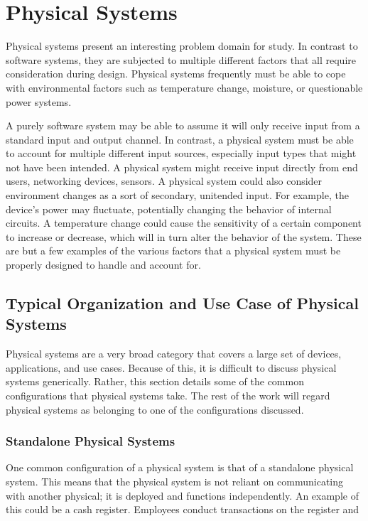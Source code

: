 
\chapter{Physical Systems}
\label{chapter:physicalsystems}

Physical systems present an interesting problem domain for study. In contrast to software systems,
they are subjected to multiple different factors that all require consideration during design. Physical
systems frequently must be able to cope with environmental factors such as temperature change, moisture,
or questionable power systems. 

A purely software system may be able to assume it will only receive input from a standard input and output
channel. In contrast, a physical system must be able
to account for multiple different input sources, especially input types that might not have been intended. 
A physical system might receive input directly from end users, networking devices, sensors. A physical
system could also consider environment changes as a sort of secondary, unitended input. For example,
the device's power may fluctuate, potentially changing the behavior of internal circuits. A temperature change
could cause the sensitivity of a certain component to increase or decrease, which will in turn alter the behavior
of the system. These are but a few examples of the various factors that a physical system must be properly
designed to handle and account for.

\section{Typical Organization and Use Case of Physical Systems}
Physical systems are a very broad category that covers a large set of devices, applications, and use cases.
Because of this, it is difficult to discuss physical systems generically. Rather, this section details some
of the common configurations that physical systems take. The rest of the work will regard physical systems as
belonging to one of the configurations discussed.

\subsection*{Standalone Physical Systems}
One common configuration of a physical system is that of a standalone physical system. This means that the
physical system is not reliant on communicating with another physical; it is deployed and functions
independently. An example of this could be a cash register. Employees conduct transactions on the register
and 

